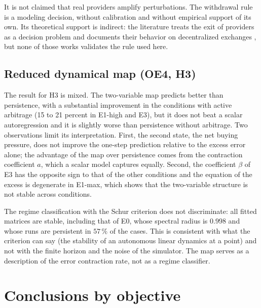 It is not claimed that real providers amplify perturbations. The withdrawal rule is a modeling decision, without calibration and without empirical support of its own. Its theoretical support is indirect: the literature treats the exit of providers as a decision problem \cite{bergault2025exit} and documents their behavior on decentralized exchanges \cite{lehar2025uniswap}, but none of those works validates the rule used here.

\subsection{Reduced dynamical map (OE4, H3)}

The result for H3 is mixed. The two-variable map predicts better than persistence, with a substantial improvement in the conditions with active arbitrage (15 to 21 percent in E1-high and E3), but it does not beat a scalar autoregression and it is slightly worse than persistence without arbitrage. Two observations limit its interpretation. First, the second state, the net buying pressure, does not improve the one-step prediction relative to the excess error alone; the advantage of the map over persistence comes from the contraction coefficient $a$, which a scalar model captures equally. Second, the coefficient $\beta$ of E3 has the opposite sign to that of the other conditions and the equation of the excess is degenerate in E1-max, which shows that the two-variable structure is not stable across conditions.

The regime classification with the Schur criterion does not discriminate: all fitted matrices are stable, including that of E0, whose spectral radius is $0.998$ and whose runs are persistent in $57\,\%$ of the cases. This is consistent with what the criterion can say (the stability of an autonomous linear dynamics at a point) and not with the finite horizon and the noise of the simulator. The map serves as a description of the error contraction rate, not as a regime classifier.

\section{Conclusions by objective}

